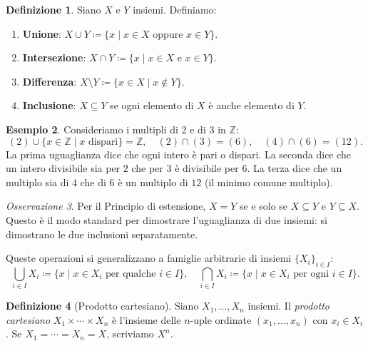 \documentclass[11pt, a4paper]{book}
\theoremstyle{definition}
\newtheorem{definizione}{Definizione}[section]
\newtheorem{esempio}[definizione]{Esempio}
\theoremstyle{plain}
\theoremstyle{remark}
\newtheorem{osservazione}[definizione]{Osservazione}
\newcommand{\Z}{\mathbb{Z}}
\begin{document}
\begin{defbox}
\begin{definizione}
Siano $X$ e $Y$ insiemi. Definiamo:
\begin{enumerate}
  \item \textbf{Unione}: $X \cup Y \coloneqq \{x \mid x \in X \text{ oppure } x \in Y\}$.
  \item \textbf{Intersezione}: $X \cap Y \coloneqq \{x \mid x \in X \text{ e } x \in Y\}$.
  \item \textbf{Differenza}: $X \setminus Y \coloneqq \{x \in X \mid x \notin Y\}$.
  \item \textbf{Inclusione}: $X \subseteq Y$ se ogni elemento di $X$ è anche elemento di $Y$.
\end{enumerate}
\end{definizione}
\end{defbox}

\begin{exbox}
\begin{esempio}
Consideriamo i multipli di $2$ e di $3$ in $\Z$:
\[
  (2) \cup \{x \in \Z \mid x \text{ dispari}\} = \Z, \quad
  (2) \cap (3) = (6), \quad
  (4) \cap (6) = (12).
\]
La prima uguaglianza dice che ogni intero è pari o dispari. La seconda dice che un intero divisibile sia per $2$ che per $3$ è divisibile per $6$. La terza dice che un multiplo sia di $4$ che di $6$ è un multiplo di $12$ (il minimo comune multiplo).
\end{esempio}
\end{exbox}

\begin{osservazione}
Per il Principio di estensione, $X = Y$ se e solo se $X \subseteq Y$ e $Y \subseteq X$. Questo è il modo standard per dimostrare l'uguaglianza di due insiemi: si dimostrano le due inclusioni separatamente.
\end{osservazione}

Queste operazioni si generalizzano a famiglie arbitrarie di insiemi $\{X_i\}_{i \in I}$:
\[
  \bigcup_{i \in I} X_i \coloneqq \{x \mid x \in X_i \text{ per qualche } i \in I\}, \quad
  \bigcap_{i \in I} X_i \coloneqq \{x \mid x \in X_i \text{ per ogni } i \in I\}.
\]

\begin{defbox}
\begin{definizione}[Prodotto cartesiano]
Siano $X_1, \ldots, X_n$ insiemi. Il \emph{prodotto cartesiano} $X_1 \times \cdots \times X_n$ è l'insieme delle $n$-uple ordinate $(x_1, \ldots, x_n)$ con $x_i \in X_i$. Se $X_1 = \cdots = X_n = X$, scriviamo $X^n$.
\end{definizione}
\end{defbox}
\end{document}
